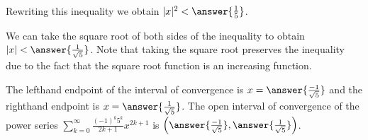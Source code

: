 \documentclass{ximera}
\begin{document}
\begin{exercise}
\begin{exercise}
\begin{hint}
Rewriting this inequality we obtain $|x|^2< \answer{\frac{1}{5}}$. 

We can take the square root of both sides of the inequality to obtain $|x|<\answer{\frac{1}{\sqrt{5}}}$. Note that taking the square root preserves the inequality due to the fact that the square root function is an increasing function.

\end{hint}

\begin{exercise}

The lefthand endpoint of the interval of convergence is $x=\answer{\frac{-1}{\sqrt{5}}}$ and the righthand endpoint is $x= \answer{\frac{1}{\sqrt{5}}}$.  The open interval of convergence of the power series $\sum_{k=0}^{\infty} \frac{(-1)^k 5^k }{2k+1}x^{2k+1}$ is $\left(\answer{\frac{-1}{\sqrt{5}} },\answer{\frac{1}{\sqrt{5}} }\right)$.

\end{exercise}
\end{exercise}
\end{exercise}
\end{document}
